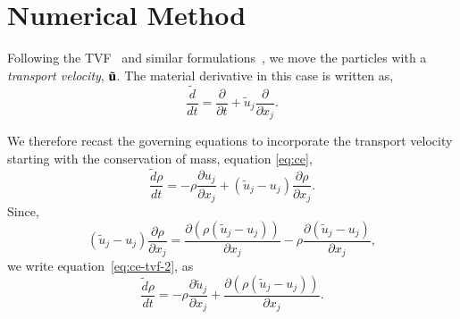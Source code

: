 \section{Numerical Method}

Following the TVF~\citep{Adami2013} and similar
formulations~\citep{oger_ale_sph_2016}, we move the particles with a
\emph{transport velocity}, $\tilde{\mathbf{u}}$. The material derivative in this
case is written as,
\begin{equation}
  \label{eq:modified-material-derivative}
  \frac{\tilde{d} }{d t} = \frac{\partial }{\partial t} +
  \tilde{u}_j \frac{\partial }{\partial x_j}.
\end{equation}

We therefore recast the governing equations to incorporate the transport
velocity starting with the conservation of mass, equation \eqref{eq:ce},
\begin{equation}
  \label{eq:ce-tvf-2}
  \frac{\tilde{d} \rho}{d t} = - \rho \frac{\partial u_j}{\partial x_j}+
  (\tilde{u}_j - u_j) \frac{\partial \rho} {\partial x_j}.
\end{equation}
Since,
\begin{equation}
  \label{eq:tmp:div-vv}
  (\tilde{u}_j - u_j)  \frac{\partial \rho}{\partial x_j} =
  \frac{\partial (\rho (\tilde{u}_j - u_j))}{\partial x_j} -
  \rho \frac{\partial (\tilde{u}_j - u_j)}{\partial x_j},
\end{equation}
we write equation~\eqref{eq:ce-tvf-2}, as
\begin{equation}
  \label{eq:ce-tvf}
  \frac{\tilde{d} \rho}{d t} =
  - \rho \frac{\partial \tilde{u}_j}{\partial x_j} +
  \frac{\partial (\rho (\tilde{u}_j - u_j))}{\partial x_j}.
\end{equation}

